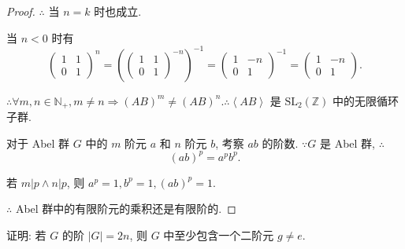\documentclass{ctexart}
\begin{document}
\begin{proof}
    $\therefore$ 当 $n=k$ 时也成立.
    
    当 $n<0$ 时有
    \[\begin{pmatrix}
        1 & 1 \\
        0 & 1
    \end{pmatrix}^n=\left(\begin{pmatrix}
        1 & 1 \\
        0 & 1
    \end{pmatrix}^{-n}\right)^{-1}=\begin{pmatrix}
        1 & -n \\
        0 & 1
    \end{pmatrix}^{-1}=\begin{pmatrix}
        1 & -n \\
        0 & 1
    \end{pmatrix}.\]
    
    $\therefore\forall m,n\in\mathbb{N}_+,m\neq n\Rightarrow(AB)^m\neq(AB)^n.\therefore\left<AB\right>$ 是 $\mathrm{SL}_2(\mathbb{Z})$ 中的无限循环子群.
    
    对于 Abel 群 $G$ 中的 $m$ 阶元 $a$ 和 $n$ 阶元 $b$, 考察 $ab$ 的阶数. $\because G$ 是 Abel 群, $\therefore$
    \[(ab)^p=a^pb^p.\]
    
    若 $m|p\land n|p$, 则 $a^p=1,b^p=1,(ab)^p=1$.
    
    $\therefore$ Abel 群中的有限阶元的乘积还是有限阶的.
\end{proof}
\begin{exercise}[2.8]
    证明: 若 $G$ 的阶 $|G|=2n$, 则 $G$ 中至少包含一个二阶元 $g\neq e$.
\end{exercise}
\end{document}
